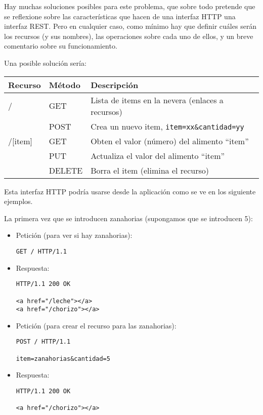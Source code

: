 Hay muchas soluciones posibles para este problema, que sobre todo pretende que se reflexione sobre las características que hacen de una interfaz HTTP una interfaz REST. Pero en cualquier caso, como mínimo hay que definir cuáles serán los recursos (y sus nombres), las operaciones sobre cada uno de ellos, y un breve comentario sobre su funcionamiento.

Una posible solución sería: \\

\begin{tabular}{l|l|p{10cm}}
  Recurso & Método & Descripción \\ \hline \hline
  /       & GET    & Lista de items en la nevera (enlaces a recursos) \\
          & POST   & Crea un nuevo item, \verb|item=xx&cantidad=yy| \\
  /[item] & GET    & Obten el valor (número) del alimento ``item'' \\
          & PUT    & Actualiza el valor del alimento ``item'' \\
          & DELETE & Borra el item (elimina el recurso) \\
\end{tabular}

Esta interfaz HTTP podría usarse desde la aplicación como se ve en los siguiente ejemplos.

La primera vez que se introducen zanahorias (supongamos que se introducen 5):

\begin{itemize}
\item Petición (para ver si hay zanahorias):
\begin{verbatim}
GET / HTTP/1.1
\end{verbatim}

\item Respuesta:
\begin{verbatim}
HTTP/1.1 200 OK

<a href="/leche"></a>
<a href="/chorizo"></a>
\end{verbatim}

\item Petición (para crear el recurso para las zanahorias):
\begin{verbatim}
POST / HTTP/1.1

item=zanahorias&cantidad=5
\end{verbatim}

\item Respuesta:
\begin{verbatim}
HTTP/1.1 200 OK

<a href="/chorizo"></a>
\end{verbatim}

\end{itemize}

